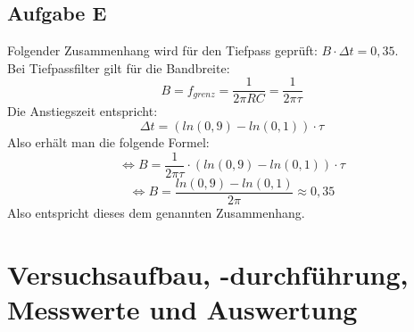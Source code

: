 \documentclass{article}
\begin{document}
\subsection*{Aufgabe E}
\label{subsec:afgE}
Folgender Zusammenhang wird für den Tiefpass geprüft:  $B\cdot \Delta t = 0,35$.\\
Bei Tiefpassfilter gilt für die Bandbreite: 
\begin{equation}
    B = f_{grenz} = \frac{1}{2\pi RC} = \frac{1}{2\pi \tau}
\end{equation}
Die Anstiegszeit entspricht:
 \begin{equation*}
     \Delta t = (ln(0,9)-ln(0,1))\cdot \tau 
 \end{equation*}
Also erhält man die folgende Formel:
 \begin{equation*}
     \iff B = \frac{1}{2\pi \tau} \cdot (ln(0,9)-ln(0,1))\cdot \tau 
 \end{equation*}
 \begin{equation*}
     \iff B = \frac{ln(0,9)-ln(0,1)}{2 \pi} \approx 0,35
 \end{equation*}
 Also entspricht dieses dem genannten Zusammenhang.

 \section{Versuchsaufbau, -durchführung, Messwerte und Auswertung}
\end{document}
